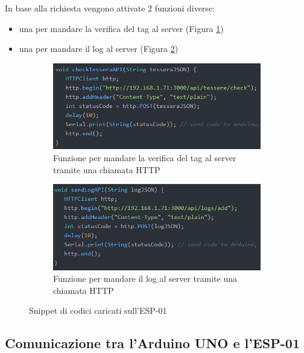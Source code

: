 \documentclass[12pt]{report}
\begin{document}
In base alla richiesta vengono attivate 2 funzioni diverse:

\begin{itemize}
	\item una per mandare la verifica del tag al server (Figura \ref{fig:esp_check})
	\item una per mandare il log al server (Figura \ref{fig:esp_log})
\end{itemize}

\begin{figure}
	\centering
	\begin{subfigure}{0.5\textwidth}
		\centering
		\includegraphics[width=0.95\linewidth]{./img/esp_check.png}
		\caption{Funzione per mandare la verifica del tag al server tramite una chiamata HTTP}
		\label{fig:esp_check}
	\end{subfigure}%
	\begin{subfigure}{0.5\textwidth}
		\centering
		\includegraphics[width=0.95\linewidth]{./img/esp_log.png}
		\caption{Funzione per mandare il log al server tramite una chiamata HTTP}
		\label{fig:esp_log}
	\end{subfigure}
	\caption{Snippet di codici caricati sull'ESP-01}
	\label{fig:esp_functions}
\end{figure}

\subsection{Comunicazione tra l'Arduino UNO e l'ESP-01 }
\end{document}
